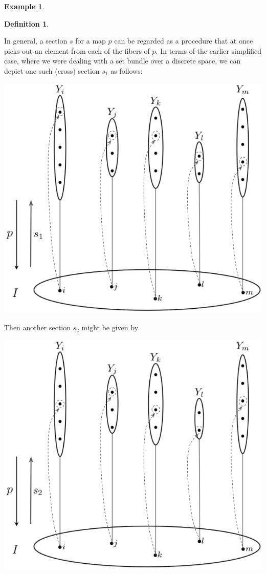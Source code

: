 \documentclass[11pt]{book}
\theoremstyle{definition}
\newtheorem{example}{Example}[section]
\theoremstyle{definition}
\newtheorem{definition}{Definition}[section]
\theoremstyle{definition}
\theoremstyle{theorem}
\theoremstyle{definition}
\begin{document}
\begin{example}
\begin{definition}
	\end{definition} 
	\noindent  
	In general, a section $s$ for a map $p$ can be regarded as a procedure that at once picks out an element from each of the fibers of $p$. 
	In terms of the earlier simplified case, where we were dealing with a set bundle over a discrete space, we can depict one such (cross) section $s_1$ as follows: 
	\begin{center}
		\includegraphics*[scale=0.3]{FirstSection.png}
	\end{center}
Then another section $s_2$ might be given by
\begin{center}
	\includegraphics*[scale=0.3]{Sec2.png}

\end{center}
\end{example}
\end{document}
